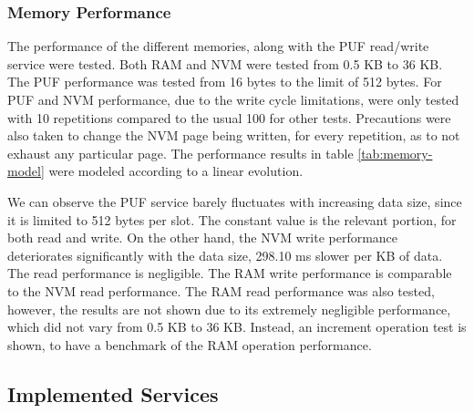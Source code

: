 \subsubsection{Memory Performance}\label{chap:evaluation:services:memory}

The performance of the different memories, along with the PUF read/write service were tested. Both RAM and NVM were tested from 0.5 KB to 36 KB. The PUF performance was tested from 16 bytes to the limit of 512 bytes. For PUF and NVM performance, due to the write cycle limitations, were only tested with 10 repetitions compared to the usual 100 for other tests. Precautions were also taken to change the NVM page being written, for every repetition, as to not exhaust any particular page.
The performance results in table \ref{tab:memory-model} were modeled according to a linear evolution.



We can observe the PUF service barely fluctuates with increasing data size, since it is limited to 512 bytes per slot. The constant value is the relevant portion, for both read and write.
On the other hand, the NVM write performance deteriorates significantly with the data size, 298.10 ms slower per KB of data. The read performance is negligible.
The RAM write performance is comparable to the NVM read performance. The RAM read performance was also tested, however, the results are not shown due to its extremely negligible performance, which did not vary from 0.5 KB to 36 KB. Instead, an increment operation test is shown, to have a benchmark of the RAM operation performance.

\subsection{Implemented Services}\label{chap:evaluation:services}

